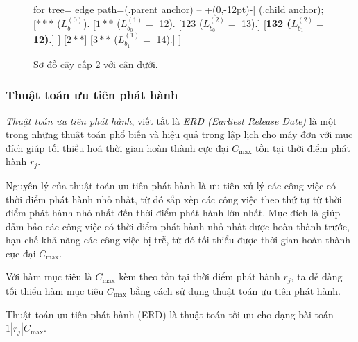 \begin{vd}
\begin{figure}[h!]
	\centering
	\begin{forest} for tree={
		edge path={\noexpand{} (.parent anchor) -- +(0,-12pt)-| (.child anchor);}
	}
	[{$***$ ($L_b^{(0)}$).}
		[{$1**$ ($L_{b_0}^{(1)} =$ 12).}
			[{$123$ ($L_{b_0}^{(2)} =$ 13).}]
			[{\textbf{132 ($L_{b_1}^{(2)} =$ 12).}}]
		]
		[$2**$]
		[{$3**$ ($L_{b_1}^{(1)} =$ 14).}]
	]
	\end{forest}
\caption{\label{vdcmaxcap2canduoi} Sơ đồ cây cấp 2 với cận dưới.}
\end{figure}

\end{vd}

\phantom{text}

\subsubsection*{Thuật toán ưu tiên phát hành}

\textit{Thuật toán ưu tiên phát hành}, viết tắt là \textit{ERD (Earliest Release Date)} là một trong những thuật toán phổ biến và hiệu quả trong lập lịch cho máy đơn với mục đích giúp tối thiểu hoá thời gian hoàn thành cực đại $C_{\max}$ tồn tại thời điểm phát hành $r_j$.

Nguyên lý của thuật toán ưu tiên phát hành là ưu tiên xử lý các công việc có thời điểm phát hành nhỏ nhất, từ đó sắp xếp các công việc theo thứ tự từ thời điểm phát hành nhỏ nhất đến thời điểm phát hành lớn nhất. Mục đích là giúp đảm bảo các công việc có thời điểm phát hành nhỏ nhất được hoàn thành trước, hạn chế khả năng các công việc bị trễ, từ đó tối thiểu được thời gian hoàn thành cực đại $C_{\max}$.

Với hàm mục tiêu là $C_{\max}$ kèm theo tồn tại thời điểm phát hành $r_j$, ta dễ dàng tối thiểu hàm mục tiêu $C_{\max}$ bằng cách sử dụng thuật toán ưu tiên phát hành.

\begin{dl}
	Thuật toán ưu tiên phát hành (ERD) là thuật toán tối ưu cho dạng bài toán $1 | r_j | C_{\max}$.
\end{dl}

